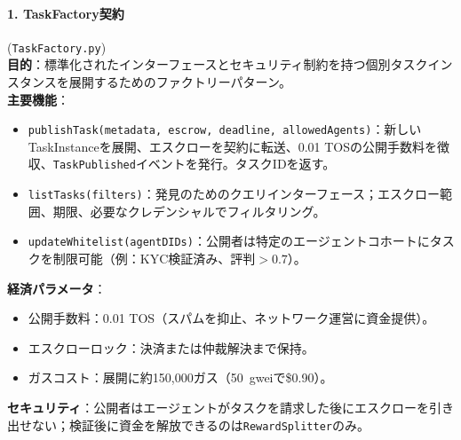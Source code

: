 \documentclass[11pt]{article}
\begin{document}
\paragraph{1. TaskFactory契約} (\texttt{TaskFactory.py})\\
\textbf{目的}：標準化されたインターフェースとセキュリティ制約を持つ個別タスクインスタンスを展開するためのファクトリーパターン。\\
\textbf{主要機能}：
\begin{itemize}[noitemsep]
  \item \texttt{publishTask(metadata, escrow, deadline, allowedAgents)}：新しいTaskInstanceを展開、エスクローを契約に転送、0.01 TOSの公開手数料を徴収、\texttt{TaskPublished}イベントを発行。タスクIDを返す。
  \item \texttt{listTasks(filters)}：発見のためのクエリインターフェース；エスクロー範囲、期限、必要なクレデンシャルでフィルタリング。
  \item \texttt{updateWhitelist(agentDIDs)}：公開者は特定のエージェントコホートにタスクを制限可能（例：KYC検証済み、評判$>0.7$）。
\end{itemize}
\textbf{経済パラメータ}：
\begin{itemize}[noitemsep]
  \item 公開手数料：0.01 TOS（スパムを抑止、ネットワーク運営に資金提供）。
  \item エスクローロック：決済または仲裁解決まで保持。
  \item ガスコスト：展開に約150,000ガス（50~gweiで\$0.90）。
\end{itemize}
\textbf{セキュリティ}：公開者はエージェントがタスクを請求した後にエスクローを引き出せない；検証後に資金を解放できるのは\texttt{RewardSplitter}のみ。
\end{document}
